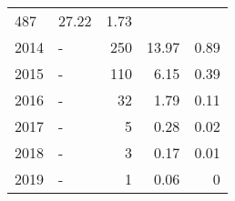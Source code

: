 \begin{longtable}{lXrrr}
       \num{487} &
       \num[round-mode=places,round-precision=2]{27,22} &
         \num[round-mode=places,round-precision=2]{1,73} \\

     2014 &
     \multicolumn{1}{X}{ -  } &


       \num{250} &
       \num[round-mode=places,round-precision=2]{13,97} &
         \num[round-mode=places,round-precision=2]{0,89} \\

     2015 &
     \multicolumn{1}{X}{ -  } &


       \num{110} &
       \num[round-mode=places,round-precision=2]{6,15} &
         \num[round-mode=places,round-precision=2]{0,39} \\

     2016 &
     \multicolumn{1}{X}{ -  } &


       \num{32} &
       \num[round-mode=places,round-precision=2]{1,79} &
         \num[round-mode=places,round-precision=2]{0,11} \\

     2017 &
     \multicolumn{1}{X}{ -  } &


       \num{5} &
       \num[round-mode=places,round-precision=2]{0,28} &
         \num[round-mode=places,round-precision=2]{0,02} \\

     2018 &
     \multicolumn{1}{X}{ -  } &


       \num{3} &
       \num[round-mode=places,round-precision=2]{0,17} &
         \num[round-mode=places,round-precision=2]{0,01} \\

     2019 &
     \multicolumn{1}{X}{ -  } &


       \num{1} &
       \num[round-mode=places,round-precision=2]{0,06} &
         \num[round-mode=places,round-precision=2]{0} \\


\end{longtable}
